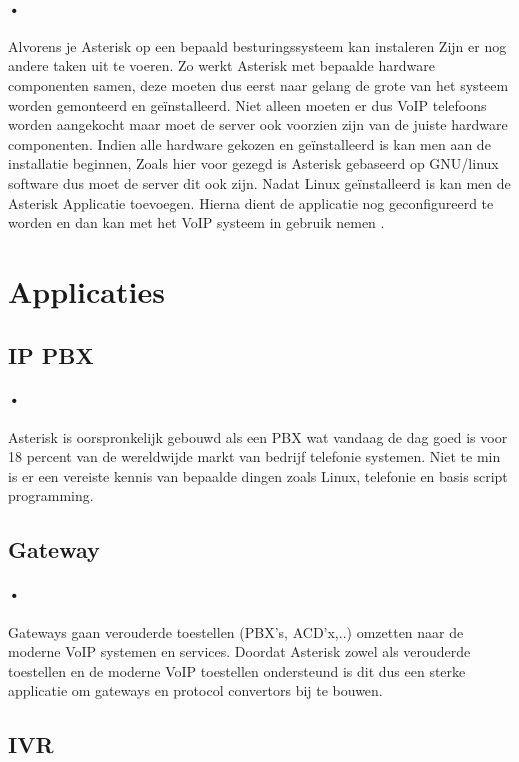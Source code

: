 \documentclass[12pt,a4paper]{report}
\begin{document}
\paragraph{•}
Alvorens je Asterisk op een bepaald besturingssysteem kan instaleren Zijn er nog andere taken uit te voeren. Zo werkt Asterisk met bepaalde hardware componenten samen, deze moeten dus eerst naar gelang de grote van het systeem worden gemonteerd en geïnstalleerd. Niet alleen moeten er dus VoIP telefoons worden aangekocht maar moet de server ook voorzien zijn van de juiste hardware componenten. Indien alle hardware gekozen en geïnstalleerd is kan men aan de installatie beginnen, Zoals hier voor gezegd is Asterisk gebaseerd op GNU/linux software dus moet de server dit ook zijn. Nadat Linux geïnstalleerd is kan men de Asterisk Applicatie toevoegen. Hierna dient de applicatie nog geconfigureerd te worden en dan kan met het VoIP systeem in gebruik nemen .

\section{Applicaties}
\subsection{IP PBX}
\paragraph{•}
Asterisk is oorspronkelijk gebouwd als een PBX wat vandaag de dag goed is voor 18 percent van de wereldwijde markt van bedrijf telefonie systemen. Niet te min is er een vereiste kennis van bepaalde dingen zoals Linux, telefonie en basis script programming.

\subsection{Gateway}
\paragraph{•}
Gateways gaan verouderde toestellen (PBX’s, ACD’x,..) omzetten naar de moderne VoIP systemen en services. Doordat Asterisk zowel als verouderde toestellen en de moderne VoIP toestellen ondersteund is dit dus een sterke applicatie om gateways en protocol convertors bij te bouwen.

\subsection{IVR}
\end{document}
